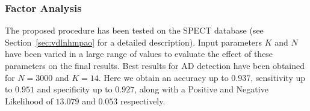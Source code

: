 


	\subsubsection{Factor Analysis}
	The proposed procedure has been tested on the SPECT database (see Section~\ref{sec:vdlnhmpao} for a detailed description). Input parameters $K$ and $N$ have been varied in a large range of values to evaluate the effect of these parameters on the final results. Best results for AD detection have been obtained for $N=3000$ and $K=14$. Here we obtain an accuracy up to $0.937$, sensitivity up to $0.951$ and specificity up to $0.927$, along with a Positive and Negative Likelihood of $13.079$ and $0.053$ respectively.
	\begin{figure}%
		\centering
		

\end{figure}
